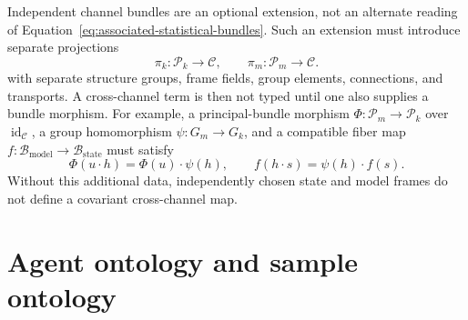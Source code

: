 Independent channel bundles are an optional extension, not an alternate reading of Equation~\eqref{eq:associated-statistical-bundles}. Such an extension must introduce separate projections
\begin{equation}
\pi_k:\mathcal P_k\longrightarrow\mathcal C,
\qquad
\pi_m:\mathcal P_m\longrightarrow\mathcal C.
\label{eq:independent-channel-principal-bundles}
\end{equation}
with separate structure groups, frame fields, group elements, connections, and transports. A cross-channel term is then not typed until one also supplies a bundle morphism. For example, a principal-bundle morphism \(\Phi:\mathcal P_m\to\mathcal P_k\) over \(\operatorname{id}_{\mathcal C}\), a group homomorphism \(\psi:G_m\to G_k\), and a compatible fiber map \(f:\mathcal B_{\mathrm{model}}\to\mathcal B_{\mathrm{state}}\) must satisfy
\begin{equation}
\Phi(u\mathbin{\cdot}h)=\Phi(u)\mathbin{\cdot}\psi(h),
\qquad
f(h\mathbin{\cdot}s)=\psi(h)\mathbin{\cdot}f(s).
\label{eq:cross-channel-bundle-morphism}
\end{equation}
Without this additional data, independently chosen state and model frames do not define a covariant cross-channel map.

\section{Agent ontology and sample ontology}

